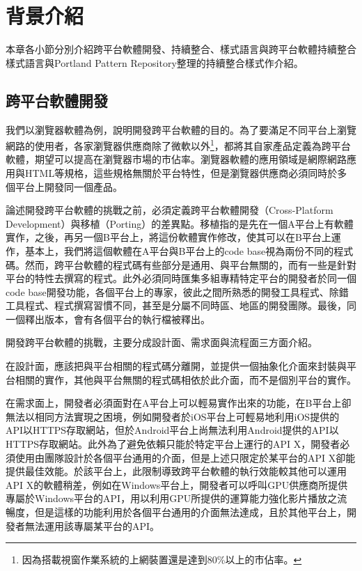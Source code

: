 \chapter{背景介紹}
本章各小節分別介紹跨平台軟體開發、持續整合、樣式語言與跨平台軟體持續整合樣式語言與Portland Pattern Repository整理的持續整合樣式\cite{portlandcipatterns}作介紹。

\section{跨平台軟體開發}

我們以瀏覽器軟體為例，說明開發跨平台軟體的目的。為了要滿足不同平台上瀏覽網路的使用者，各家瀏覽器供應商除了微軟以外\footnote{因為搭載視窗作業系統的上網裝置還是達到80\%以上的市佔率。\cite{osmarketshare}}，都將其自家產品定義為跨平台軟體，期望可以提高在瀏覽器市場的市佔率。瀏覽器軟體的應用領域\cite{applicationdomain}是網際網路應用與HTML等規格，這些規格無關於平台特性，但是瀏覽器供應商必須同時於多個平台上開發同一個產品。

論述開發跨平台軟體的挑戰之前，必須定義跨平台軟體開發（Cross-Platform Development）與移植（Porting）的差異點\cite{crossplatformpotingdiff}。移植指的是先在一個A平台上有軟體實作，之後，再另一個B平台上，將這份軟體實作修改，使其可以在B平台上運作，基本上，我們將這個軟體在A平台與B平台上的code base視為兩份不同的程式碼。然而，跨平台軟體的程式碼有些部分是通用、與平台無關的，而有一些是針對平台的特性去撰寫的程式。此外必須同時匯集多組專精特定平台的開發者於同一個code base開發功能，各個平台上的專家，彼此之間所熟悉的開發工具程式、除錯工具程式、程式撰寫習慣不同，甚至是分屬不同時區、地區的開發團隊。最後，同一個釋出版本，會有各個平台的執行檔被釋出。

開發跨平台軟體的挑戰，主要分成設計面、需求面與流程面三方面介紹。

在設計面，應該把與平台相關的程式碼分離開，並提供一個抽象化介面來封裝與平台相關的實作，其他與平台無關的程式碼相依於此介面，而不是個別平台的實作\cite{gofdesignpattern}\cite{slogan}。

在需求面上，開發者必須面對在A平台上可以輕易實作出來的功能，在B平台上卻無法以相同方法實現之困境，例如開發者於iOS平台上可輕易地利用iOS提供的API以HTTPS存取網站，但於Android平台上尚無法利用Android提供的API以HTTPS存取網站。此外為了避免依賴只能於特定平台上運行的API X，開發者必須使用由團隊設計於各個平台通用的介面，但是上述只限定於某平台的API X卻能提供最佳效能。於該平台上，此限制導致跨平台軟體的執行效能較其他可以運用API X的軟體稍差\cite{netscapecrossplatform}，例如在Windows平台上，開發者可以呼叫GPU供應商所提供專屬於Windows平台的API，用以利用GPU所提供的運算能力強化影片播放之流暢度，但是這樣的功能利用於各個平台通用的介面無法達成，且於其他平台上，開發者無法運用該專屬某平台的API。

